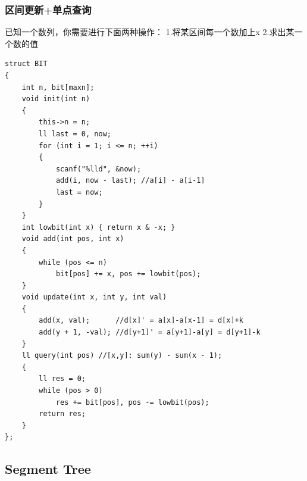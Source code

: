 \documentclass[twoside]{article}
\begin{document}
\subsubsection{区间更新+单点查询}
已知一个数列，你需要进行下面两种操作：
1.将某区间每一个数加上x   2.求出某一个数的值
\begin{lstlisting}
struct BIT
{
    int n, bit[maxn];
    void init(int n)
    {
        this->n = n;
        ll last = 0, now;
        for (int i = 1; i <= n; ++i)
        {
            scanf("%lld", &now);
            add(i, now - last); //a[i] - a[i-1]
            last = now;
        }
    }
    int lowbit(int x) { return x & -x; }
    void add(int pos, int x)
    {
        while (pos <= n)
            bit[pos] += x, pos += lowbit(pos);
    }
    void update(int x, int y, int val)
    {
        add(x, val);      //d[x]' = a[x]-a[x-1] = d[x]+k
        add(y + 1, -val); //d[y+1]' = a[y+1]-a[y] = d[y+1]-k
    }
    ll query(int pos) //[x,y]: sum(y) - sum(x - 1);
    {
        ll res = 0;
        while (pos > 0)
            res += bit[pos], pos -= lowbit(pos);
        return res;
    }
};
\end{lstlisting}
\subsection{Segment Tree}
\end{document}
